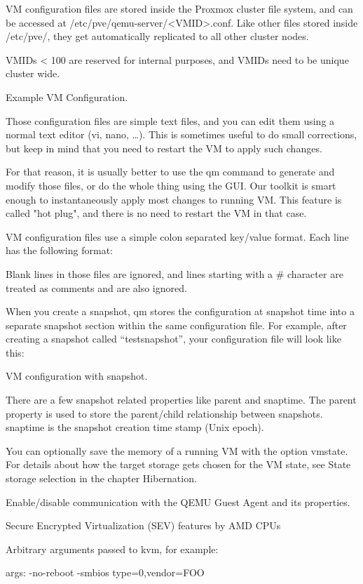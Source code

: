 VM configuration files are stored inside the Proxmox cluster file system, and can be accessed at /etc/pve/qemu-server/<VMID>.conf. Like other files stored inside /etc/pve/, they get automatically replicated to all other cluster nodes.

VMIDs < 100 are reserved for internal purposes, and VMIDs need to be unique cluster wide.

Example VM Configuration.

Those configuration files are simple text files, and you can edit them using a normal text editor (vi, nano, …). This is sometimes useful to do small corrections, but keep in mind that you need to restart the VM to apply such changes.

For that reason, it is usually better to use the qm command to generate and modify those files, or do the whole thing using the GUI. Our toolkit is smart enough to instantaneously apply most changes to running VM. This feature is called "hot plug", and there is no need to restart the VM in that case.

VM configuration files use a simple colon separated key/value format. Each line has the following format:

Blank lines in those files are ignored, and lines starting with a # character are treated as comments and are also ignored.

When you create a snapshot, qm stores the configuration at snapshot time into a separate snapshot section within the same configuration file. For example, after creating a snapshot called “testsnapshot”, your configuration file will look like this:

VM configuration with snapshot.

There are a few snapshot related properties like parent and snaptime. The parent property is used to store the parent/child relationship between snapshots. snaptime is the snapshot creation time stamp (Unix epoch).

You can optionally save the memory of a running VM with the option vmstate. For details about how the target storage gets chosen for the VM state, see State storage selection in the chapter Hibernation.

Enable/disable communication with the QEMU Guest Agent and its properties.

Secure Encrypted Virtualization (SEV) features by AMD CPUs

Arbitrary arguments passed to kvm, for example:

args: -no-reboot -smbios type=0,vendor=FOO

